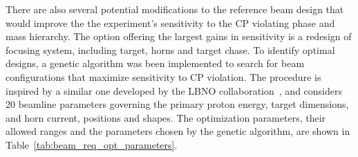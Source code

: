 There are also several potential modifications to the reference beam
design that would improve the
the experiment's sensitivity to the CP violating phase and mass hierarchy.  
The option offering the largest gains in sensitivity is a redesign of 
focusing system, including target, horns and target chase.  To identify optimal
designs, a genetic algorithm was been implemented to search
for beam configurations that maximize sensitivity to CP violation.
The procedure is inspired by a similar one developed by the
LBNO collaboration~\cite{LBNO}, and considers 20 beamline
parameters governing the primary proton energy, target dimensions, and
horn current, positions and shapes.   The optimization parameters,
their allowed ranges and the parameters chosen by the genetic
algorithm, are shown in Table~\ref{tab:beam_req_opt_parameters}.

